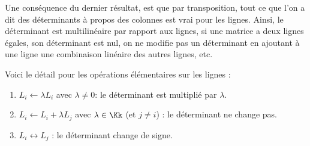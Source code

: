 \documentclass[class=report,crop=false]{standalone}
\begin{document}
\begin{remarque*}
Une conséquence du dernier résultat, est que par transposition, tout ce que l'on a
dit des déterminants à propos des colonnes est
vrai pour les lignes. Ainsi, le déterminant est multilinéaire
par rapport aux lignes, si une matrice a deux lignes égales,
son déterminant est nul, on ne modifie pas un déterminant en
ajoutant à une ligne une combinaison linéaire des autres lignes, etc.

\bigskip

Voici le détail pour les opérations élémentaires sur les lignes :
\begin{enumerate}
  \item $L_i \leftarrow \lambda L_i$ avec $\lambda \neq 0$: le déterminant est
  multiplié par $\lambda$.

  \item $L_i \leftarrow L_i+\lambda L_j$ avec $\lambda \in \Kk$ (et $j\neq i$) :
  le déterminant ne change pas.

  \item $L_i \leftrightarrow L_j$ : le déterminant change de signe.
\end{enumerate}
\end{remarque*}



\end{document}
